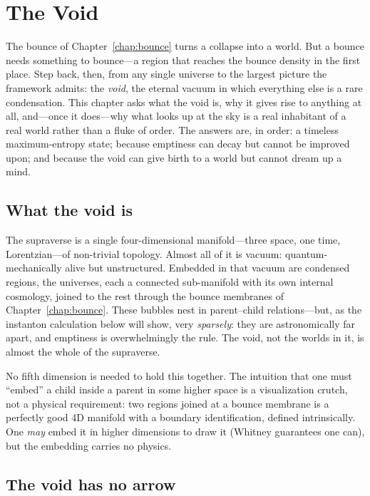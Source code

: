 \chapter{The Void}
\label{chap:void}

The bounce of Chapter~\ref{chap:bounce} turns a collapse into a world. But a
bounce needs something to bounce---a region that reaches the bounce density in
the first place. Step back, then, from any single universe to the largest picture
the framework admits: the \emph{void}, the eternal vacuum in which everything
else is a rare condensation. This chapter asks what the void is, why it gives
rise to anything at all, and---once it does---why what looks up at the sky is a
real inhabitant of a real world rather than a fluke of order. The answers are, in
order: a timeless maximum-entropy state; because emptiness can decay but cannot
be improved upon; and because the void can give birth to a world but cannot dream
up a mind.

\section{What the void is}

The supraverse is a single four-dimensional manifold---three space, one time,
Lorentzian---of non-trivial topology. Almost all of it is vacuum:
quantum-mechanically alive but unstructured. Embedded in that vacuum are condensed
regions, the universes, each a connected sub-manifold with its own internal
cosmology, joined to the rest through the bounce membranes of
Chapter~\ref{chap:bounce}. These bubbles nest in parent--child relations---but, as
the instanton calculation below will show, very \emph{sparsely}: they are
astronomically far apart, and emptiness is overwhelmingly the rule. The void, not
the worlds in it, is almost the whole of the supraverse.

No fifth dimension is needed to hold this together. The intuition that one must
``embed'' a child inside a parent in some higher space is a visualization crutch,
not a physical requirement: two regions joined at a bounce membrane is a
perfectly good 4D manifold with a boundary identification, defined intrinsically.
One \emph{may} embed it in higher dimensions to draw it (Whitney guarantees one
can), but the embedding carries no physics.

\section{The void has no arrow}
\label{sec:no-arrow}

